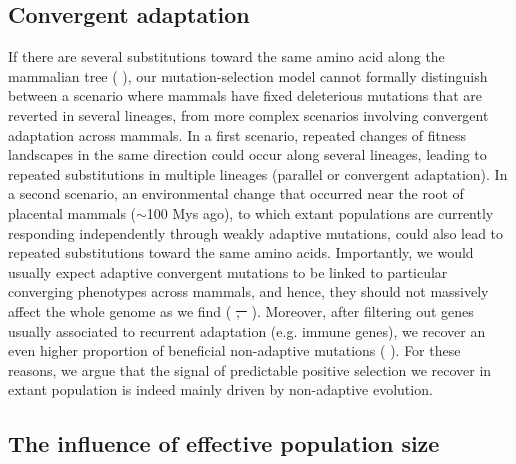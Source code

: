 \documentclass[10pt,letterpaper]{article}
\providecommand{\DIFaddtex}[1]{{\protect\color{blue}\uwave{#1}}} %
\providecommand{\DIFdeltex}[1]{{\protect\color{red}\sout{#1}}}                      %
\providecommand{\DIFaddbegin}{} %
\providecommand{\DIFaddend}{} %
\providecommand{\DIFdelbegin}{} %
\providecommand{\DIFdelend}{} %
\providecommand{\DIFadd}[1]{\texorpdfstring{\DIFaddtex{#1}}{#1}} %
\providecommand{\DIFdel}[1]{\texorpdfstring{\DIFdeltex{#1}}{}} %
\newcommand{\DIFscaledelfig}{0.5}
\newlength{\DIFdelgraphicswidth} %
\newlength{\DIFdelgraphicsheight} %
\newcommand{\DIFaddincludegraphics}[2][]{{\color{blue}\fbox{\DIFOincludegraphics[#1]{#2}}}} %
\newcommand{\DIFdelincludegraphics}[2][]{%
\sbox{\DIFdelgraphicsbox}{\DIFOincludegraphics[#1]{#2}}%
\settoboxwidth{\DIFdelgraphicswidth}{\DIFdelgraphicsbox} %
\settoboxtotalheight{\DIFdelgraphicsheight}{\DIFdelgraphicsbox} %
\scalebox{\DIFscaledelfig}{%
\parbox[b]{\DIFdelgraphicswidth}{\usebox{\DIFdelgraphicsbox}\\[-\baselineskip] \rule{\DIFdelgraphicswidth}{0em}}\llap{\resizebox{\DIFdelgraphicswidth}{\DIFdelgraphicsheight}{%
\setlength{\unitlength}{\DIFdelgraphicswidth}%
\begin{picture}(1,1)%
\thicklines\linethickness{2pt} %
{\color[rgb]{1,0,0}\put(0,0){\framebox(1,1){}}}%
{\color[rgb]{1,0,0}\put(0,0){\line( 1,1){1}}}%
{\color[rgb]{1,0,0}\put(0,1){\line(1,-1){1}}}%
\end{picture}%
}\hspace*{3pt}}} %
} %
\DeclareRobustCommand{\DIFaddbegin}{\DIFOaddbegin \let\includegraphics\DIFaddincludegraphics} %
\DeclareRobustCommand{\DIFaddend}{\DIFOaddend \let\includegraphics\DIFOincludegraphics} %
\DeclareRobustCommand{\DIFdelbegin}{\DIFOdelbegin \let\includegraphics\DIFdelincludegraphics} %
\DeclareRobustCommand{\DIFdelend}{\DIFOaddend \let\includegraphics\DIFOincludegraphics} %
\begin{document}
\subsection*{Convergent adaptation}

If there are several substitutions toward the same amino acid along the mammalian tree (\DIFdelbegin %
\DIFdelend \DIFaddbegin \DIFadd{section~1.1 in~}\DIFaddend ), our mutation-selection model cannot formally distinguish between a scenario where mammals have fixed deleterious mutations that are reverted in several lineages, from more complex scenarios involving convergent adaptation across mammals.
In a first scenario, repeated changes of fitness landscapes in the same direction could occur along several lineages, leading to repeated substitutions in multiple lineages (parallel or convergent adaptation).
In a second scenario, an environmental change that occurred near the root of placental mammals ($\sim$100 Mys ago), to which extant populations are currently responding independently through weakly adaptive mutations, could also lead to repeated substitutions toward the same amino acids.
Importantly, we would usually expect adaptive convergent mutations to be linked to particular converging phenotypes across mammals, and hence, they should not massively affect the whole genome as we find (\DIFdelbegin %
\DIFdel{,~}%
\DIFdelend \DIFaddbegin \DIFadd{Fig~C and Table~D in~}\DIFaddend ).
Moreover, after filtering out genes usually associated to recurrent adaptation (e.g. immune genes), we recover an even higher proportion of beneficial non-adaptive mutations (\DIFdelbegin %
\DIFdelend \DIFaddbegin \DIFadd{Table~D in~}\DIFaddend ).
For these reasons, we argue that the signal of predictable positive selection we recover in extant population is indeed mainly driven by non-adaptive evolution.

\subsection*{The influence of effective population size}
\end{document}
